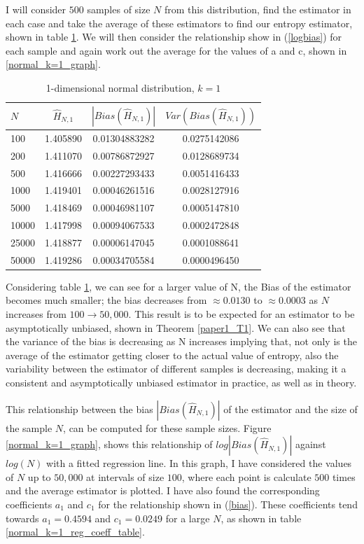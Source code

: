 \documentclass{article}
\begin{document}
I will consider $500$ samples of size $N$ from this distribution, find the estimator in each case and take the average of these estimators to find our entropy estimator, shown in table \ref{normal_k=1_table}. We will then consider the relationship show in (\ref{logbias}) for each sample and again work out the average for the values of a and c, shown in \ref{normal_k=1_graph}.

\begin{table}
\caption{1-dimensional normal distribution, $k=1$} \label{normal_k=1_table}
\begin{center}
\begin{tabular}{| l | c c c|} 
\toprule
$N$ & $\hat{H}_{N, 1}$ & $|Bias(\hat{H}_{N, 1})|$ & $Var(Bias(\hat{H}_{N, 1}))$ \\
\midrule[1pt]
100     & 1.405890     & 0.01304883282     & 0.0275142086  \\
200     & 1.411070     & 0.00786872927     & 0.0128689734  \\
500     & 1.416666     & 0.00227293433     & 0.0051416433  \\
1000    & 1.419401     & 0.00046261516     & 0.0028127916  \\
5000    & 1.418469     & 0.00046981107     & 0.0005147810  \\
10000   & 1.417998     & 0.00094067533     & 0.0002472848  \\
25000   & 1.418877     & 0.00006147045     & 0.0001088641  \\
50000   & 1.419286     & 0.00034705584     & 0.0000496450  \\
\hline
\end{tabular}
\end{center}
\end{table}

Considering table \ref{normal_k=1_table}, we can see for a larger value of N, the Bias of the estimator becomes much smaller; the bias decreases from $\approx 0.0130$ to $\approx 0.0003$ as $N$ increases from $100 \to 50,000$. This result is to be expected for an estimator to be asymptotically unbiased, shown in Theorem \ref{paper1_T1}. We can also see that the variance of the bias is decreasing as N increases implying that, not only is the average of the estimator getting closer to the actual value of entropy, also the variability between the estimator of different samples is decreasing, making it a consistent and asymptotically unbiased estimator in practice, as well as in theory.

This relationship between the bias $|Bias(\hat{H}_{N, 1})|$ of the estimator and the size of the sample $N$, can be computed for these sample sizes. Figure \ref{normal_k=1_graph}, shows this relationship of $log|Bias(\hat{H}_{N, 1})|$ against $log(N)$ with a fitted regression line. In this graph, I have considered the values of $N$ up to $50,000$ at intervals of size $100$, where each point is calculate $500$ times and the average estimator is plotted. I have also found the corresponding coefficients $a_{1}$ and $c_{1}$ for the relationship shown in (\ref{bias}). These coefficients tend towards $a_{1} = 0.4594$ and $c_{1} = 0.0249$ for a large $N$, as shown in table \ref{normal_k=1_reg_coeff_table}. 
 
\end{document}
